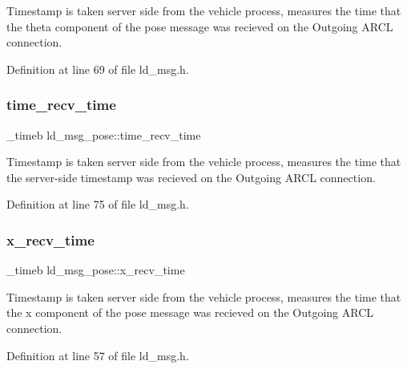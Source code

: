 Timestamp is taken server side from the vehicle process, measures the time that the theta component of the pose message was recieved on the Outgoing A\+R\+CL connection. 

Definition at line 69 of file ld\+\_\+msg.\+h.

\mbox{\label{structld__msg__pose_a68a03febea822176935f8e14f1897b54}} 
\subsubsection{\texorpdfstring{time\+\_\+recv\+\_\+time}{time\_recv\_time}}
{\footnotesize\ttfamily \+\_\+timeb ld\+\_\+msg\+\_\+pose\+::time\+\_\+recv\+\_\+time}

Timestamp is taken server side from the vehicle process, measures the time that the server-\/side timestamp was recieved on the Outgoing A\+R\+CL connection. 

Definition at line 75 of file ld\+\_\+msg.\+h.

\mbox{\label{structld__msg__pose_a4a4636747213a18e34dc05b5ea964dfd}} 
\subsubsection{\texorpdfstring{x\+\_\+recv\+\_\+time}{x\_recv\_time}}
{\footnotesize\ttfamily \+\_\+timeb ld\+\_\+msg\+\_\+pose\+::x\+\_\+recv\+\_\+time}

Timestamp is taken server side from the vehicle process, measures the time that the x component of the pose message was recieved on the Outgoing A\+R\+CL connection. 

Definition at line 57 of file ld\+\_\+msg.\+h.

\mbox{\label{structld__msg__pose_a1ab8f32a7a2edd172e33057719dbe9e9}} 
